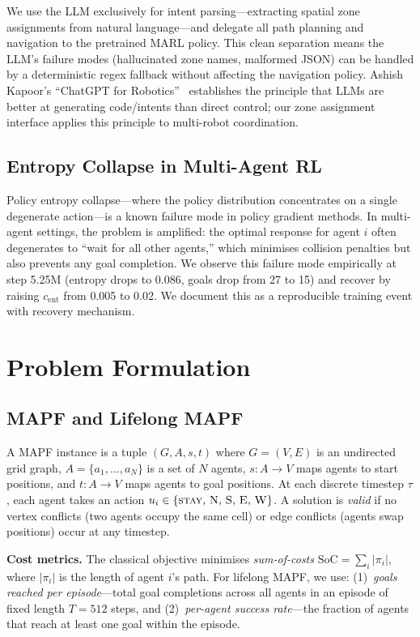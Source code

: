 \documentclass[letterpaper,twocolumn,10pt]{article}
\begin{document}
We use the LLM exclusively for intent parsing---extracting spatial zone assignments
from natural language---and delegate all path planning and navigation to the
pretrained MARL policy. This clean separation means the LLM's failure modes
(hallucinated zone names, malformed JSON) can be handled by a deterministic
regex fallback without affecting the navigation policy. Ashish Kapoor's
``ChatGPT for Robotics''~\cite{liang2023code4robotics} establishes the principle
that LLMs are better at generating code/intents than direct control; our zone
assignment interface applies this principle to multi-robot coordination.

\subsection{Entropy Collapse in Multi-Agent RL}

Policy entropy collapse---where the policy distribution concentrates on a single
degenerate action---is a known failure mode in policy gradient methods. In
multi-agent settings, the problem is amplified: the optimal response for agent $i$
often degenerates to ``wait for all other agents,'' which minimises collision
penalties but also prevents any goal completion. We observe this failure mode
empirically at step 5.25M (entropy drops to 0.086, goals drop from 27 to 15) and
recover by raising $c_\text{ent}$ from 0.005 to 0.02. We document this as a
reproducible training event with recovery mechanism.

\section{Problem Formulation}

\subsection{MAPF and Lifelong MAPF}

A MAPF instance is a tuple $(G, A, s, t)$ where $G = (V, E)$ is an undirected grid
graph, $A = \{a_1, \ldots, a_N\}$ is a set of $N$ agents, $s: A \to V$ maps agents
to start positions, and $t: A \to V$ maps agents to goal positions. At each
discrete timestep $\tau$, each agent takes an action
$u_i \in \{\textsc{stay},\,\textsc{N},\,\textsc{S},\,\textsc{E},\,\textsc{W}\}$.
A solution is \emph{valid} if no vertex conflicts (two agents occupy the same cell)
or edge conflicts (agents swap positions) occur at any timestep.

\textbf{Cost metrics.} The classical objective minimises \emph{sum-of-costs}
$\text{SoC} = \sum_i |\pi_i|$, where $|\pi_i|$ is the length of agent $i$'s path.
For lifelong MAPF, we use: (1)~\emph{goals reached per episode}---total goal
completions across all agents in an episode of fixed length $T = 512$ steps, and
(2)~\emph{per-agent success rate}---the fraction of agents that reach at least one
goal within the episode.
\end{document}
